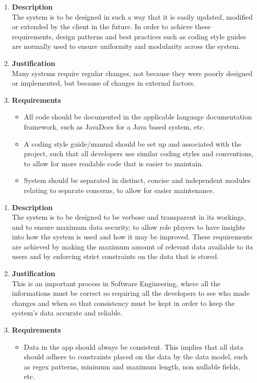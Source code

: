 \documentclass[a4paper,10pt]{article}
\begin{document}
\begin{enumerate}
\item \textbf{Description} \\
The system is to be designed in such a way that it is easily updated, modified or extended by the client in the future. In order to achieve these requirements, design patterns and best practices such as coding style guides are normally used to ensure uniformity and modularity across the system.
\item \textbf{Justification} \\
Many systems require regular changes, not because they were poorly designed or implemented, but because of changes in external factors.
\item \textbf{Requirements}
	\begin{itemize}
		\item All code should be documented in the applicable language documentation framework, such as JavaDocs for a Java based system, etc.
		\item A coding style guide/manual should be set up and associated with the project, such that all developers use similar coding styles and conventions, to allow for more readable code that is easier to maintain.
		\item System should be separated in distinct, concise and independent modules relating to separate concerns, to allow for easier maintenance.
	\end{itemize}
\end{enumerate}
\begin{enumerate}
\item \textbf{Description} \\
The system is to be designed to be verbose and transparent in its workings, and to ensure maximum data security, to allow role players to have insights into how the system is used and how it may be improved. These requirements are achieved by making the maximum amount of relevant data available to its users and by enforcing strict constraints on the data that is stored. 
\item \textbf{Justification} \\
This is an important process in Software Engineering, where all the informations must be correct so requiring all the developers to see who made changes and when so that consistency must be kept in order to keep the system's data accurate and reliable.
\item \textbf{Requirements}
	\begin{itemize}
		\item Data in the app should always be consistent. This implies that all data should adhere to constraints placed on the data by the data model, such as regex patterns, minimum and maximum length, non nullable fields, etc.
	\end{itemize}
\end{enumerate}
\end{document}
